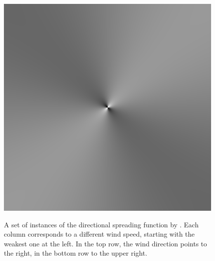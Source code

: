 \begin{figure}
{ }
 \hfill
 \subtop
 {
 \includegraphics[scale=0.25]{figures/unified_dfilt_wur_sqrt200.png}
 }
\caption{A set of instances of the directional spreading function by
\citet{article:Elfouhaily1997}. Each column 
corresponds to a different wind speed, starting with the weakest one at the 
left. In the top row, the wind direction points to the right, in the bottom row 
to the upper right.}
\label{fig:unified_directional_filter}
\end{figure}
%

